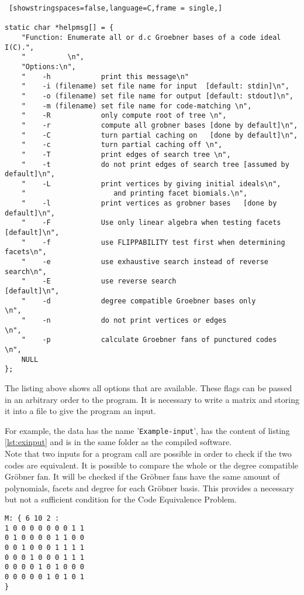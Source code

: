 \begin{lstlisting} [showstringspaces=false,language=C,frame = single,]

static char *helpmsg[] = {
    "Function: Enumerate all or d.c Groebner bases of a code ideal I(C).",
    "          \n",
    "Options:\n",
    "    -h            print this message\n"
    "    -i (filename) set file name for input  [default: stdin]\n",
    "    -o (filename) set file name for output [default: stdout]\n",
    "    -m (filename) set file name for code-matching \n",
    "    -R            only compute root of tree \n",
    "    -r            compute all grobner bases [done by default]\n",
    "    -C            turn partial caching on   [done by default]\n",
    "    -c            turn partial caching off \n",
    "    -T            print edges of search tree \n",
    "    -t            do not print edges of search tree [assumed by default]\n",  
    "    -L            print vertices by giving initial ideals\n",
    "                     and printing facet biomials.\n",
    "    -l            print vertices as grobner bases   [done by default]\n",
    "    -F            Use only linear algebra when testing facets [default]\n",
    "    -f            use FLIPPABILITY test first when determining facets\n",
    "    -e            use exhaustive search instead of reverse search\n",
    "    -E            use reverse search                   [default]\n",
    "    -d            degree compatible Groebner bases only         \n",
    "    -n            do not print vertices or edges                \n",
    "    -p            calculate Groebner fans of punctured codes    \n",
    NULL
};

\end{lstlisting}

The listing above shows all options that are available. These flags can be passed in an arbitrary order to the program. It is necessary to write a matrix and storing it into a file to give the program an input.

For example, the data has the name '\texttt{Example-input}', has the content of listing \ref{lst:exinput} and is in the same folder as the compiled software.\\
Note that two inputs for a program call are possible in order to check if the two codes are equivalent. It is possible to compare the whole or the degree compatible Gröbner fan. It will be checked if the Gröbner fans have the same amount of polynomials, facets and degree for each Gröbner basis. This provides a necessary but not a sufficient condition for the Code Equivalence Problem. 
\begin{lstlisting}[basicstyle=\fontfamily{courier}\selectfont,label=lst:exinput]
M: { 6 10 2 :
1 0 0 0 0 0 0 0 1 1 
0 1 0 0 0 0 1 1 0 0 
0 0 1 0 0 0 1 1 1 1 
0 0 0 1 0 0 0 1 1 1 
0 0 0 0 1 0 1 0 0 0 
0 0 0 0 0 1 0 1 0 1 
}
\end{lstlisting}

